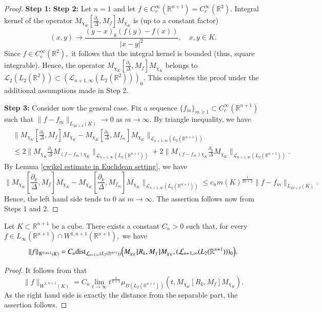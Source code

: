 \documentclass{amsart}
\begin{document}
\begin{proof} {\bf Step 1:}
{\bf Step 2:} Let $n=1$ and let $f\in C^{\infty}_c(\mathbb{R}^{n+1})=C^{\infty}_c(\mathbb{R}^2).$ Integral kernel of the operator $M_{\chi_K}[\frac{\partial_k}{\Delta},M_f]M_{\chi_K}$ is (up to a constant factor)
$$(x,y)\to\frac{(y-x)_k(f(y)-f(x))}{|x-y|^2},\quad x,y\in K.$$
Since $f\in C^{\infty}_c(\mathbb{R}^2),$ it follows that the integral kernel is bounded (thus, square integrable).  Hence, the operator $M_{\chi_K}[\frac{\partial_k}{\Delta},M_f]M_{\chi_K}$ belongs to $\mathcal{L}_2(L_2(\mathbb{R}^2))\subset (\mathcal{L}_{n+1,\infty}(L_2(\mathbb{R}^2)))_0.$ This completes the proof under the additional assumptions made in Step 2.

{\bf Step 3:} Consider now the general case. Fix a sequence $\{f_m\}_{m\geq1}\subset C^{\infty}_c(\mathbb{R}^{n+1})$ such that $\|f-f_m\|_{L_{2n+2}(K)}\to0$ as $m\to\infty.$ By triangle inequality, we have
\begin{align*}
&\|M_{\chi_K}[\frac{\partial_k}{\Delta},M_f]M_{\chi_K}-M_{\chi_K}[\frac{\partial_k}{\Delta},M_{f_m}]M_{\chi_K}\|_{\mathcal{L}_{n+1,\infty}(L_2(\mathbb{R}^{n+1}))}\\
&\leq 2\|M_{\chi_K}\frac{\partial_k}{\Delta}M_{(f-f_m) \chi_K}\|_{\mathcal{L}_{n+1,\infty}(L_2(\mathbb{R}^{n+1}))}+2\|M_{(f-f_m)\chi_K}\frac{\partial_k}{\Delta}M_{\chi_K}\|_{\mathcal{L}_{n+1,\infty}(L_2(\mathbb{R}^{n+1}))}.
\end{align*}
By Lemma \ref{cwikel estimate in Euclidean setting}, we have
$$\|M_{\chi_K}[\frac{\partial_k}{\Delta},M_f]M_{\chi_K}-M_{\chi_K}[\frac{\partial_k}{\Delta},M_{f_m}]M_{\chi_K}\|_{\mathcal{L}_{n+1,\infty}(L_2(\mathbb{R}^{n+1}))}\leq c_nm(K)^{\frac1{2n+2}}\|f-f_m\|_{L_{2n+2}(K)}.$$
Hence, the left hand side tends to $0$ as $m\to\infty.$ The assertion follows now from Steps 1 and 2.
\end{proof}

\begin{lemma}\label{first distance lemma} Let $K\subset\mathbb{R}^{n+1}$ be a cube. There exists a constant $C_n>0$ such that, for every $f\in L_{\infty}(\mathbb{R}^{n+1})\cap W^{1,n+1}(\mathbb{R}^{n+1}),$ we have
$$\|f\|_{\dot{W}^{1,n+1}(K)}=C_n{\rm dist}_{\mathcal{L}_{n+1,\infty}(L_2(\mathbb{R}^{n+1}))}\Big(M_{\chi_K}[R_k,M_f]M_{\chi_K},(\mathcal{L}_{n+1,\infty}(L_2(\mathbb{R}^{n+1})))_0\Big).$$
\end{lemma}
\begin{proof}
It follows from \cite[Proposition 8.6]{FSZ} that
$$\|f\|_{\dot{W}^{1,n+1}(K)}=C_n \lim_{t\to\infty}t^{\frac1{n+1}}\mu_{B(L_2(\mathbb{R}^{n+1}))}(t,M_{\chi_K}[R_k,M_f]M_{\chi_K}).$$
As the right hand side is exactly the distance from the separable part, the assertion follows.
\end{proof}
\end{document}
